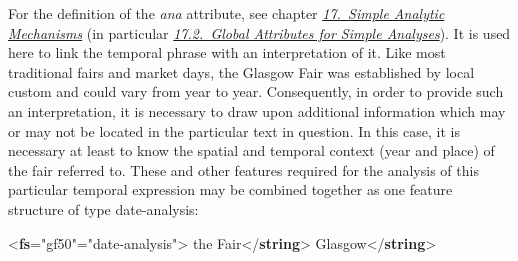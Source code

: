 For the definition of the {\itshape ana} attribute, see chapter \textit{\hyperref[AI]{17.\ Simple Analytic Mechanisms}} (in particular \textit{\hyperref[AIATTS]{17.2.\ Global Attributes for Simple Analyses}}). It is used here to link the temporal phrase with an interpretation of it. Like most traditional fairs and market days, the Glasgow Fair was established by local custom and could vary from year to year. Consequently, in order to provide such an interpretation, it is necessary to draw upon additional information which may or may not be located in the particular text in question. In this case, it is necessary at least to know the spatial and temporal context (year and place) of the fair referred to. These and other features required for the analysis of this particular temporal expression may be combined together as one feature structure of type date-analysis: \par\bgroup{}\exampleFont \begin{shaded}\noindent\mbox{}{<\textbf{fs}\hspace*{1em}{xml:id}="{gf50}"\hspace*{1em}{type}="{date-analysis}">}\mbox{}\newline 
{}\mbox{}\newline 
\hspace*{1em}the Fair{</\textbf{string}>}\mbox{}\newline 
{}\mbox{}\newline 
{}\mbox{}\newline 
\hspace*{1em}Glasgow{</\textbf{string}>}\mbox{}\newline 

\end{shaded}
